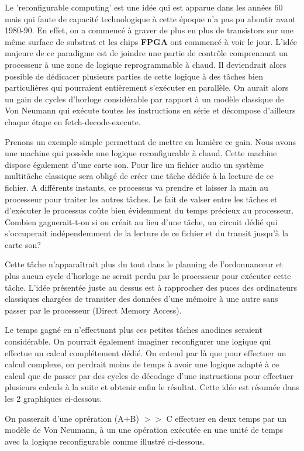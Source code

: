 Le 'reconfigurable computing' est une idée qui est apparue dans les années 60 mais
qui faute de capacité technologique à cette époque n'a pas pu aboutir avant 1980-90.
En effet, on a commencé à graver de plus en plus de transistors sur une même surface
de substrat et les chips {\bf FPGA} ont commencé à voir le jour.  L'idée majeure de
ce paradigme est de joindre une partie de contrôle comprennant un processeur à une
zone de logique reprogrammable à chaud. Il deviendrait alors possible de dédicacer
plusieurs parties de cette logique à des tâches bien particulières qui pourraient
entièrement s’exécuter en parallèle. On aurait alors un gain de cycles d'horloge
considérable par rapport à un modèle classique de Von Neumann qui exécute toutes les
instructions en série et décompose d'ailleurs chaque étape en fetch-decode-execute.

Prenons un exemple simple permettant de mettre en lumière ce gain. Nous avons une
machine qui possède une logique reconfigurable à chaud. Cette machine dispose
également d'une carte son. Pour lire un fichier audio un système multitâche classique
sera obligé de créer une tâche dédiée à la lecture de ce fichier. A différents
instants, ce processus va prendre et laisser la main au processeur pour traiter les
autres tâches. Le fait de valser entre les tâches et d'exécuter le processus coûte
bien évidemment du temps précieux au processeur. Combien gagnerait-t-on si on créait
au lieu d'une tâche, un circuit dédié qui s'occuperait indépendemment de la lecture
de ce fichier et du transit jusqu'à la carte son?

Cette tâche n'apparaîtrait plus du tout dans le planning de l'ordonnanceur et plus
aucun cycle d'horloge ne serait perdu par le processeur pour exécuter cette tâche.
L'idée présentée juste au dessus est à rapprocher des puces des ordinateurs
classiques chargées de transiter des données d'une mémoire à une autre sans passer
par le processeur (Direct Memory Access).

Le temps gagné en n'effectuant plus ces petites tâches anodines seraient
considérable. On pourrait également imaginer reconfigurer une logique qui effectue un
calcul complétement dédié. On entend par là que pour effectuer un calcul complexe, on
perdrait moins de temps à avoir une logique adapté à ce calcul que de passer par des
cycles de décodage d'une instructions pour effectuer plusieurs calculs à la suite et
obtenir enfin le résultat. Cette idée est résumée dans les 2 graphiques ci-dessous.

On passerait d'une oprération (A+B) $>>$ C effectuer en deux temps par un modèle de
Von Neumann, à un une opération exécutée en une unité de temps avec la logique
reconfigurable comme illustré ci-dessous.


